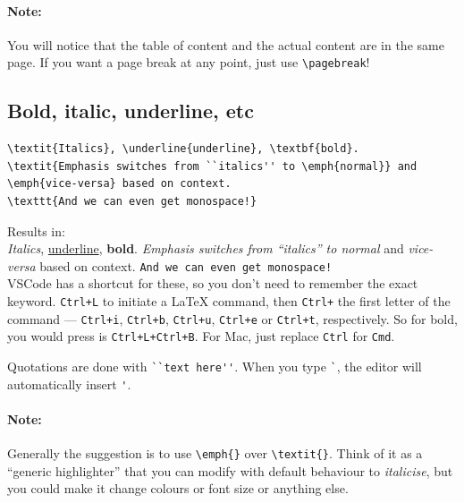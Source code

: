 \paragraph{Note:} You will notice that the table of content and the actual content are in the same page. If you want a page break at any point, just use \verb|\pagebreak|!

\subsection{Bold, italic, underline, etc}

\begin{lstlisting}
\textit{Italics}, \underline{underline}, \textbf{bold}.
\textit{Emphasis switches from ``italics'' to \emph{normal}} and \emph{vice-versa} based on context.
\texttt{And we can even get monospace!}
\end{lstlisting}
Results in: \\
\textit{Italics}, \underline{underline}, \textbf{bold}.
\textit{Emphasis switches from ``italics'' to \emph{normal}} and \emph{vice-versa} based on context.
\texttt{And we can even get monospace!}\\

VSCode has a shortcut for these, so you don't need to remember the exact keyword. \verb|Ctrl+L| to initiate a LaTeX command, then \verb|Ctrl+| the first letter of the command --- \verb|Ctrl+i|, \verb|Ctrl+b|, \verb|Ctrl+u|, \verb|Ctrl+e| or \verb|Ctrl+t|, respectively.
So for bold, you would press is \verb|Ctrl+L+Ctrl+B|.
For Mac, just replace \verb|Ctrl| for \verb|Cmd|.

Quotations are done with \verb|``text here''|.
When you type \verb|`|, the editor will automatically insert \verb|'|.

\paragraph{Note:} Generally the suggestion is to use \verb|\emph{}| over \verb|\textit{}|. Think of it as a ``generic highlighter'' that you can modify with default behaviour to \emph{italicise}, but you could make it change colours or font size or anything else.